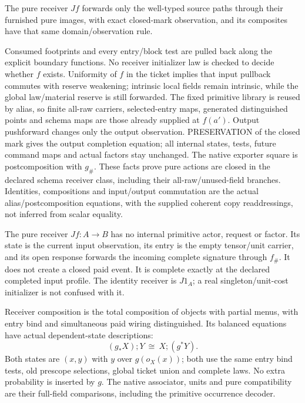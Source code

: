 \documentclass[11pt]{article}
\begin{document}
The pure receiver $Jf$ forwards only the well-typed source paths through their furnished pure images, with exact closed-mark observation, and its composites have that same domain/observation rule.

Consumed footprints and every entry/block test are pulled back along the explicit boundary functions. No receiver initializer law is checked to decide whether $f$ exists. Uniformity of $f$ in the ticket implies that input pullback commutes with reserve weakening; intrinsic local fields remain intrinsic, while the global law/material reserve is still forwarded. The fixed primitive library is reused by alias, so finite all-raw carriers, selected-entry maps, generated distinguished points and schema maps are those already supplied at $f(a')$. Output pushforward changes only the output observation. PRESERVATION of the closed mark gives the output completion equation; all internal states, tests, future command maps and actual factors stay unchanged. The native exporter square is postcomposition with $g_\#$. These facts prove pure actions are closed in the declared schema receiver class, including their all-raw/unused-field branches. Identities, compositions and input/output commutation are the actual alias/postcomposition equations, with the supplied coherent copy readdressings, not inferred from scalar equality.

The pure receiver $Jf:A\to B$ has no internal primitive actor, request or factor. Its state is the current input observation, its entry is the empty tensor/unit carrier, and its open response forwards the incoming complete signature through $f_\#$. It does not create a closed paid event. It is complete exactly at the declared completed input profile. The identity receiver is $J1_A$; a real singleton/unit-cost initializer is not confused with it.

Receiver composition is the total composition of objects with partial menus, with entry bind and simultaneous paid wiring distinguished. Its balanced equations have actual dependent-state descriptions:
\[
 (g_*X);Y\ \cong\ X;(g^*Y).
\]
Both states are $(x,y)$ with $y$ over $g(o_X(x))$; both use the same entry bind tests, old prescope selections, global ticket union and complete laws. No extra probability is inserted by $g$. The native associator, units and pure compatibility are their full-field comparisons, including the primitive occurrence decoder.
\end{document}
